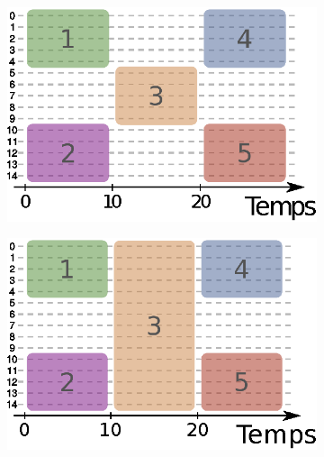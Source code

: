  
\begin{figure}
\centering
	\begin{subfigure}{0.3\textwidth}
		\includegraphics[width=\textwidth]{img/Qualite/topologie1.eps}
		\caption{}
		\label{fig:versqualite_gen_test1}
	\end{subfigure}\hspace*{0.1\textwidth}
	\begin{subfigure}{0.3\textwidth}
		\includegraphics[width=\textwidth]{img/Qualite/topologie2.eps}
		\caption{}
		\label{fig:versqualite_gen_test2}
	\end{subfigure}
	

\end{figure}

